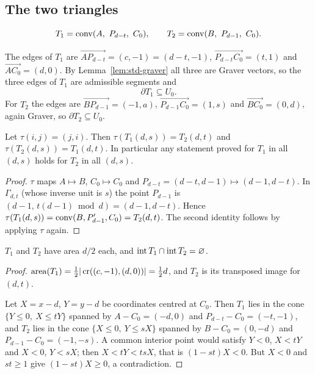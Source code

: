 \subsection{The two triangles}

\begin{definition}\label{def:T}
\[
  T_1=\conv(A,\ P_{d-t},\ C_0),\qquad T_2=\conv(B,\ P_{d-1},\ C_0).
\]
\end{definition}

The edges of $T_1$ are $\overrightarrow{AP_{d-t}}=(c,-1)=(d-t,-1)$, $\overrightarrow{P_{d-t}C_0}=(t,1)$ and $\overrightarrow{AC_0}=(d,0)$. By Lemma~\ref{lem:std-graver} all three are Graver vectors, so the three edges of $T_1$ are admissible segments and
\begin{equation}\label{eq:dT1}
  \partial T_1\subseteq U_0.
\end{equation}
For $T_2$ the edges are $\overrightarrow{BP_{d-1}}=(-1,a)$, $\overrightarrow{P_{d-1}C_0}=(1,s)$ and $\overrightarrow{BC_0}=(0,d)$, again Graver, so $\partial T_2\subseteq U_0$.

\begin{lemma}\label{lem:T-transpose}
Let $\tau(i,j)=(j,i)$. Then $\tau(T_1(d,s))=T_2(d,t)$ and $\tau(T_2(d,s))=T_1(d,t)$. In particular any statement proved for $T_1$ in all $(d,s)$ holds for $T_2$ in all $(d,s)$.
\end{lemma}
\begin{proof}
$\tau$ maps $A\mapsto B$, $C_0\mapsto C_0$ and $P_{d-t}=(d-t,d-1)\mapsto(d-1,d-t)$. In $\Gamma_{d,t}$ (whose inverse unit is $s$) the point $P_{d-1}$ is $(d-1,\,t(d-1)\bmod d)=(d-1,d-t)$. Hence $\tau(T_1(d,s))=\operatorname{conv}(B,P'_{d-1},C_0)=T_2(d,t)$. The second identity follows by applying $\tau$ again.
\end{proof}

\begin{lemma}\label{lem:T-disjoint}
$T_1$ and $T_2$ have area $d/2$ each, and $\operatorname{int} T_1\cap\operatorname{int} T_2=\varnothing$.
\end{lemma}
\begin{proof}
$\mathrm{area}(T_1)=\tfrac12|\operatorname{cr}((c,-1),(d,0))|=\tfrac12 d$, and $T_2$ is its transposed image for $(d,t)$.

Let $X=x-d$, $Y=y-d$ be coordinates centred at $C_0$. Then $T_1$ lies in the cone $\{Y\le0,\ X\le tY\}$ spanned by $A-C_0=(-d,0)$ and $P_{d-t}-C_0=(-t,-1)$, and $T_2$ lies in the cone $\{X\le0,\ Y\le sX\}$ spanned by $B-C_0=(0,-d)$ and $P_{d-1}-C_0=(-1,-s)$. A common interior point would satisfy $Y<0$, $X<tY$ and $X<0$, $Y<sX$; then $X<tY<tsX$, that is $(1-st)X<0$. But $X<0$ and $st\ge1$ give $(1-st)X\ge0$, a contradiction.
\end{proof}

